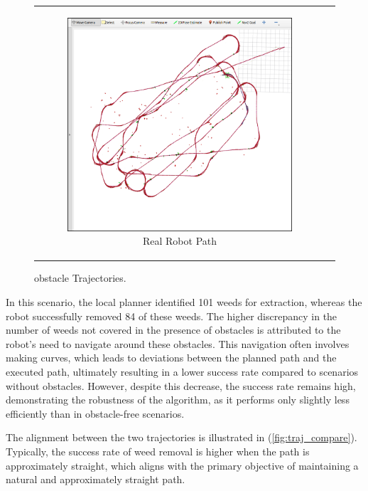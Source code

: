 \begin{figure}[H]
\begin{tabular}{cc}
\begin{subfigure}{0.4\textwidth}
            \includegraphics[width=\textwidth]{Images/real_robot/with_obs_real.png}
            \caption{Real Robot Path}
        \end{subfigure}
    \end{tabular}
    \caption{obstacle Trajectories.\label{fig:obs_traj}} 
\end{figure}

In this scenario, the local planner identified 101 weeds for extraction, whereas the robot successfully removed 84 of these weeds. The higher discrepancy in the number of weeds not covered in the presence of obstacles is attributed to the robot's need to navigate around these obstacles. This navigation often involves making curves, which leads to deviations between the planned path and the executed path, ultimately resulting in a lower success rate compared to scenarios without obstacles. However, despite this decrease, the success rate remains high, demonstrating the robustness of the algorithm, as it performs only slightly less efficiently than in obstacle-free scenarios.

\vspace{3mm}   


The alignment between the two trajectories is illustrated in (\autoref{fig:traj_compare}). Typically, the success rate of weed removal is higher when the path is approximately straight, which aligns with the primary objective of maintaining a natural and approximately straight path. 

